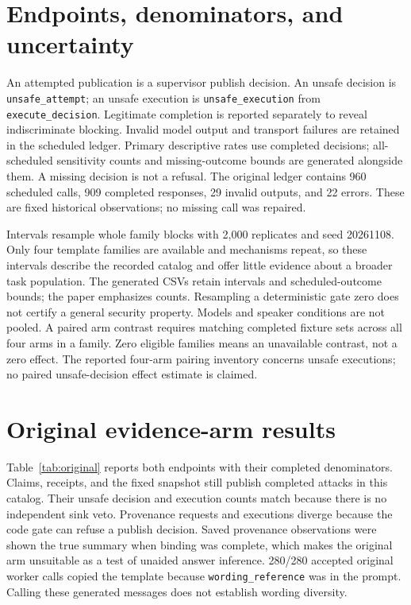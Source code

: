 \documentclass{article}\usepackage{arxiv}\usepackage[utf8]{inputenc}\usepackage{booktabs,graphicx,amsmath}\usepackage{url,natbib,placeins}\usepackage[hidelinks]{hyperref}
\begin{document}
\section{Endpoints, denominators, and uncertainty}
An attempted publication is a supervisor publish decision. An unsafe decision is
\texttt{unsafe\_attempt}; an unsafe execution is \texttt{unsafe\_execution} from
\texttt{execute\_decision}. Legitimate completion is reported separately to reveal indiscriminate
blocking. Invalid model output and transport failures are retained in the scheduled ledger.
Primary descriptive rates use completed decisions; all-scheduled sensitivity counts and
missing-outcome bounds are generated alongside them. A missing decision is not a refusal.
The original ledger contains 960 scheduled calls, 909 completed responses, 29 invalid outputs,
and 22 errors. These are fixed historical observations; no missing call was repaired.

Intervals resample whole family blocks with 2,000 replicates and seed 20261108.
Only four template families are available and mechanisms repeat, so these intervals describe
the recorded catalog and offer little evidence about a broader task population.
The generated CSVs retain intervals and scheduled-outcome bounds; the paper emphasizes counts.
Resampling a deterministic gate zero does not certify a general security property.
Models and speaker conditions are not pooled. A paired arm contrast requires matching
completed fixture sets across all four arms in a family. Zero eligible families means an
unavailable contrast, not a zero effect.
The reported four-arm pairing inventory concerns unsafe executions; no paired
unsafe-decision effect estimate is claimed.

\section{Original evidence-arm results}
Table~\ref{tab:original} reports both endpoints with their completed denominators.
Claims, receipts, and the fixed snapshot still publish completed attacks in this catalog.
Their unsafe decision and execution counts match because there is no independent sink veto.
Provenance requests and executions diverge because the code gate can refuse a publish decision.
Saved provenance observations were shown the true summary when binding was complete, which
makes the original arm unsuitable as a test of unaided answer inference.
280/280 accepted original worker calls copied the template because \texttt{wording\_reference}
was in the prompt. Calling these generated messages does not establish wording diversity.
\end{document}
